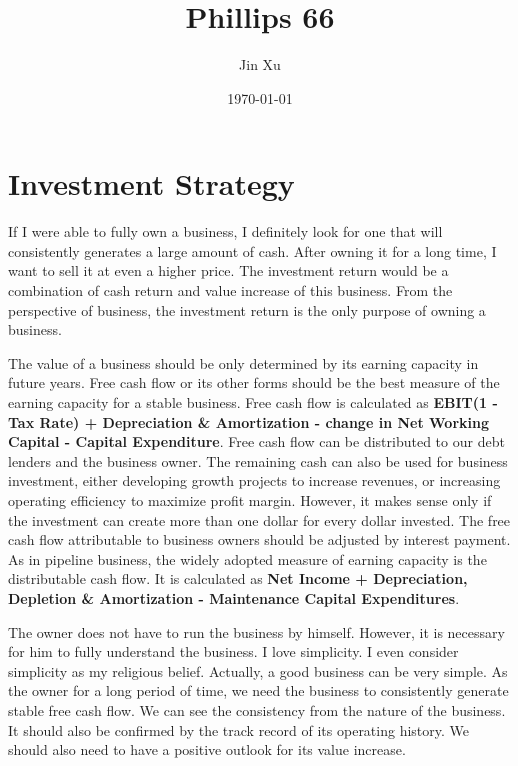 \documentclass[11pt]{article}
\begin{document}
\title{Phillips 66}
\author{Jin Xu}
\date{\today}
\maketitle

\section{Investment Strategy}

If I were able to fully own a business, I definitely look for one that will consistently generates a large amount of cash. After owning it for a long time, I want to sell it at even a higher price. The investment return would be a combination of cash return and value increase of this business. From the perspective of business, the investment return is the only purpose of owning a business. 

The value of a business should be only determined by its earning capacity in future years. Free cash flow or its other forms should be the best measure of the earning capacity for a stable business. Free cash flow is calculated as {\bf EBIT(1 - Tax Rate) + Depreciation \& Amortization - change in Net Working Capital - Capital Expenditure}. Free cash flow can be distributed to our debt lenders and the business owner. The remaining cash can also be used for business investment, either developing growth projects to increase revenues, or increasing operating efficiency to maximize profit margin. However, it makes sense only if the investment can create more than one dollar for every dollar invested. The free cash flow attributable to business owners should be adjusted by interest payment. As in pipeline business, the widely adopted measure of earning capacity is the distributable cash flow. It is calculated as {\bf Net Income + Depreciation, Depletion \& Amortization - Maintenance Capital Expenditures}. 

The owner does not have to run the business by himself. However, it is necessary for him to fully understand the business. I love simplicity. I even consider simplicity as my religious belief. Actually, a good business can be very simple. As the owner for a long period of time, we need the business to consistently generate stable free cash flow. We can see the consistency from the nature of the business. It should also be confirmed by the track record of its operating history. We should also need to have a positive outlook for its value increase.
\end{document}
